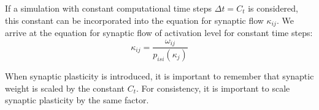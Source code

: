 	If a simulation with constant computational time steps $\Delta t = C_t$ is considered, this constant can be incorporated into the equation for synaptic flow $\kappa_{ij}$.
	We arrive at the equation for synaptic flow of activation level for constant time steps:
	\begin{equation}
		\kappa_{ij} = \frac{ \omega_{ij} }{ p_{isi}(\kappa_{j})}
		\label{eqSynapticTransmissionForKANN}
	\end{equation}
	
	When synaptic plasticity is introduced, it is important to remember that synaptic weight is scaled by the constant $C_t$.
	For consistency, it is important to scale synaptic plasticity by the same factor.


